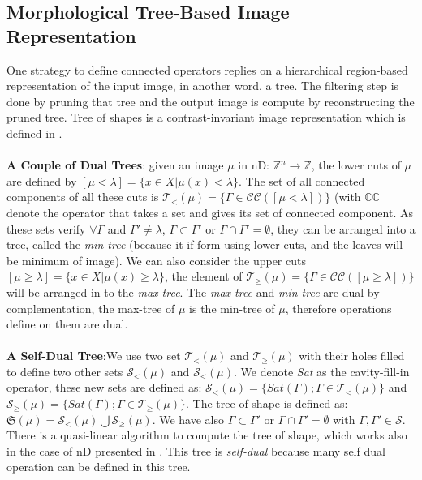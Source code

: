 \subsection{Morphological Tree-Based Image Representation}
One strategy to define connected operators replies on a hierarchical region-based representation of the input image, in another word, a tree. The filtering step is done by pruning that tree and the output image is compute by reconstructing the pruned tree.  Tree of shapes is a contrast-invariant image representation which is defined in \cite{Monasse.2000}.
\paragraph{} \textbf{A Couple of Dual Trees}: given an image $\mu $ in nD: $\mathbb{Z}^{n} \rightarrow \mathbb{Z} $, the lower cuts of $\mu$ are defined by 
	$[\mu < \lambda] =\lbrace x \in X \vert \mu (x) < \lambda \rbrace $. The set of all connected components of all these cuts is $ \mathcal{T}_< (\mu) =\lbrace \Gamma \in \mathcal{C}\mathcal{C}([\mu < \lambda]) \rbrace $ (with $\mathbb{C}\mathbb{C}$ denote the operator that takes a set and gives its set of connected component. As these sets verify $\forall \Gamma$ and $\Gamma ' \neq \lambda$, $\Gamma \subset \Gamma ' $ or $\Gamma \cap \Gamma '= \emptyset$, they can be arranged into a tree, called the \textit{min-tree} (because it if form using lower cuts, and the leaves will be minimum of image). We can also consider the upper cuts $[\mu \geq \lambda] =\lbrace x \in X \vert \mu (x) \geq \lambda \rbrace $, the element of $ \mathcal{T}_\geq (\mu) =\lbrace \Gamma \in \mathcal{C}\mathcal{C}([\mu \geq \lambda]) \rbrace $ will be arranged in to the \textit{max-tree}. The \textit{max-tree} and \textit{min-tree} are dual by complementation, the max-tree of $\mu$ is the min-tree of $ \mu$, therefore operations define on them are dual.
	
\paragraph{} \textbf{A Self-Dual Tree}:We use two set $ \mathcal{T}_< (\mu)$ and $ \mathcal{T}_\geq (\mu)$ with their holes filled to define two other sets $ \mathcal{S}_< (\mu)$ and $ \mathcal{S}_< (\mu)$. We denote \textit{Sat} as the cavity-fill-in operator, these new sets are defined as: $ \mathcal{S}_< (\mu) = \lbrace Sat(\Gamma);\Gamma \in \mathcal{T}_<(\mu)\rbrace$ and $ \mathcal{S}_\geq (\mu) = \lbrace Sat(\Gamma);\Gamma \in \mathcal{T}_\geq (\mu)\rbrace$. The tree of shape is defined as: $\mathfrak{S}(\mu) = \mathcal{S}_< (\mu) \bigcup \mathcal{S}_\geq (\mu) $. We have also $\Gamma \subset \Gamma ' $ or $\Gamma \cap \Gamma '= \emptyset$ with $\Gamma , \Gamma ' \in \mathcal{S}$. There is a quasi-linear algorithm to compute the tree of shape, which works also in the case of nD presented in \cite{geraud.13.ismm}. This tree is \textit{self-dual} because many self dual operation can be defined in this tree.

